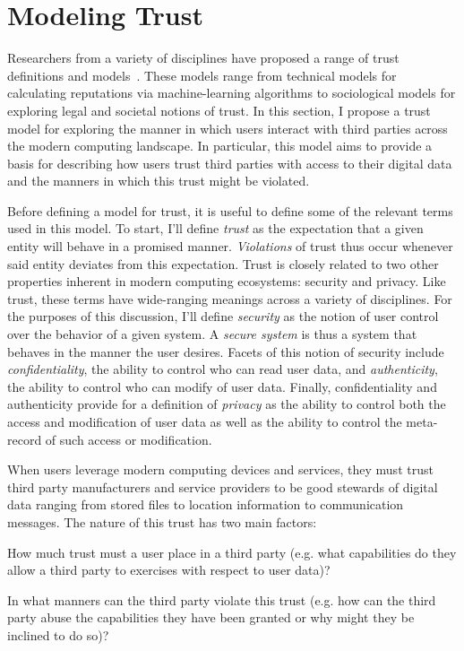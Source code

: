 \section{Modeling Trust}
\label{sec:model}

Researchers from a variety of disciplines have proposed a range of
trust definitions and models~\cite{grandison2000, camp2003,
  sabater2005, flowerday2006}. These models range from technical
models for calculating reputations via machine-learning algorithms to
sociological models for exploring legal and societal notions of
trust. In this section, I propose a trust model for exploring the
manner in which users interact with third parties across the modern
computing landscape. In particular, this model aims to provide a basis
for describing how users trust third parties with access to their
digital data and the manners in which this trust might be violated.

Before defining a model for trust, it is useful to define some of the
relevant terms used in this model. To start, I'll define
\textit{trust} as the expectation that a given entity will behave in a
promised manner. \textit{Violations} of trust thus occur whenever said
entity deviates from this expectation. Trust is closely related to two
other properties inherent in modern computing ecosystems: security and
privacy. Like trust, these terms have wide-ranging meanings across a
variety of disciplines. For the purposes of this discussion, I'll
define \textit{security} as the notion of user control over the
behavior of a given system. A \textit{secure system} is thus a system
that behaves in the manner the user desires. Facets of this notion of
security include \textit{confidentiality}, the ability to control who
can read user data, and \textit{authenticity}, the ability to control
who can modify of user data. Finally, confidentiality and authenticity
provide for a definition of \textit{privacy} as the ability to control
both the access and modification of user data as well as the ability
to control the meta-record of such access or modification.

When users leverage modern computing devices and services, they must
trust third party manufacturers and service providers to be good
stewards of digital data ranging from stored files to location
information to communication messages. The nature of this trust has
two main factors:

\begin{packed_desc}
\item[Degree:] How much trust must a user place in a third party
  (e.g. what capabilities do they allow a third party to exercises with
  respect to user data)?
\item[Violation:] In what manners can the third party violate this
  trust (e.g. how can the third party abuse the capabilities they have
  been granted or why might they be inclined to do so)?
\end{packed_desc}

